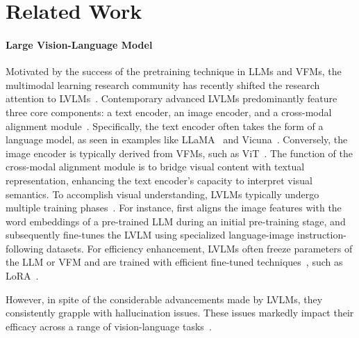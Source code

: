\section{Related Work}
\paragraph{Large Vision-Language Model}
Motivated by the success of the pretraining technique in LLMs and VFMs, the multimodal learning research community has recently shifted the research attention to LVLMs~\cite{DBLP:journals/corr/abs-2308-01390,DBLP:journals/corr/abs-2305-03726}. 
Contemporary advanced LVLMs predominantly feature three core components: a text encoder, an image encoder, and a cross-modal alignment module~\cite{DBLP:conf/emnlp/RohrbachHBDS18}. Specifically, the text encoder often takes the form of a language model, as seen in examples like LLaMA~\cite{llama} and Vicuna~\cite{vicuna}. Conversely, the image encoder is typically derived from VFMs, such as ViT~\cite{vit}. The function of the cross-modal alignment module is to bridge visual content with textual representation, enhancing the text encoder's capacity to interpret visual semantics. 
To accomplish visual understanding, LVLMs typically undergo multiple training phases~\cite{MultiModal-GPT,minigpt4,llava15,llava,mPLUG-Owl,InstructBLIP}. 
For instance, \citet{llava} first aligns the image features with the word embeddings of a pre-trained LLM during an initial pre-training stage, and subsequently fine-tunes the LVLM using specialized language-image instruction-following datasets. 
For efficiency enhancement, LVLMs often freeze parameters of the LLM or VFM and are trained with efficient fine-tuned techniques~\cite{mPLUG-Owl,InstructBLIP}, such as LoRA~\cite{lora}.

However, in spite of the considerable advancements made by LVLMs, they consistently grapple with hallucination issues. These issues markedly impact their efficacy across a range of vision-language tasks~\cite{DBLP:conf/emnlp/RohrbachHBDS18}. 

